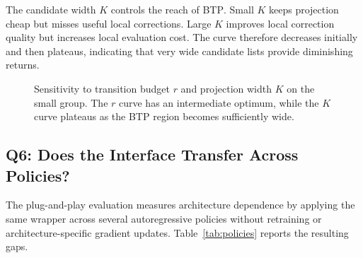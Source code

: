 \documentclass[11pt]{article}
\newcommand{\BTP}{\textsc{BTP}}
\begin{document}
The candidate width $K$ controls the reach of \BTP{}. Small $K$ keeps projection cheap but misses useful local corrections. Large $K$ improves local correction quality but increases local evaluation cost. The curve therefore decreases initially and then plateaus, indicating that very wide candidate lists provide diminishing returns.

\begin{figure}[t]
\centering
\begin{minipage}{0.48\linewidth}
\centering
{}
\end{minipage}
\hfill
\begin{minipage}{0.48\linewidth}
\centering
{}
\end{minipage}
\caption{Sensitivity to transition budget $r$ and projection width $K$ on the small group. The $r$ curve has an intermediate optimum, while the $K$ curve plateaus as the \BTP{} region becomes sufficiently wide.}
\label{fig:sensitivity-rk}
\end{figure}

\subsection{Q6: Does the Interface Transfer Across Policies?}

The plug-and-play evaluation measures architecture dependence by applying the same wrapper across several autoregressive policies without retraining or architecture-specific gradient updates. Table~\ref{tab:policies} reports the resulting gaps.
\end{document}
